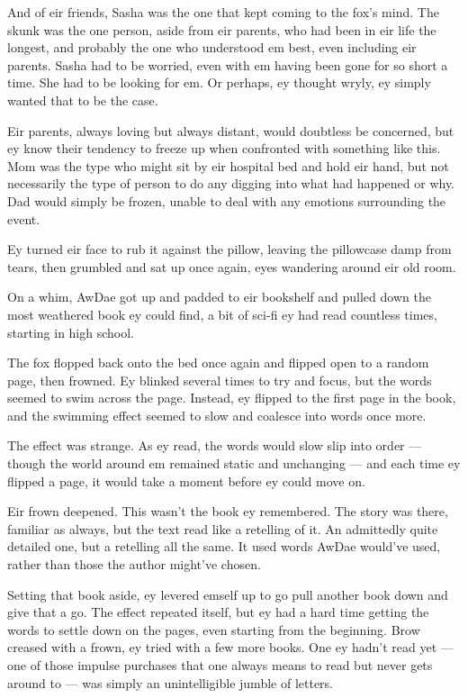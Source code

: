 And of eir friends, Sasha was the one that kept coming to the fox's mind. The skunk was the one person, aside from eir parents, who had been in eir life the longest, and probably the one who understood em best, even including eir parents. Sasha had to be worried, even with em having been gone for so short a time. She had to be looking for em. Or perhaps, ey thought wryly, ey simply wanted that to be the case.

Eir parents, always loving but always distant, would doubtless be concerned, but ey know their tendency to freeze up when confronted with something like this. Mom was the type who might sit by eir hospital bed and hold eir hand, but not necessarily the type of person to do any digging into what had happened or why. Dad would simply be frozen, unable to deal with any emotions surrounding the event.

Ey turned eir face to rub it against the pillow, leaving the pillowcase damp from tears, then grumbled and sat up once again, eyes wandering around eir old room.

On a whim, AwDae got up and padded to eir bookshelf and pulled down the most weathered book ey could find, a bit of sci-fi ey had read countless times, starting in high school.

The fox flopped back onto the bed once again and flipped open to a random page, then frowned. Ey blinked several times to try and focus, but the words seemed to swim across the page. Instead, ey flipped to the first page in the book, and the swimming effect seemed to slow and coalesce into words once more.

The effect was strange. As ey read, the words would slow slip into order --- though the world around em remained static and unchanging --- and each time ey flipped a page, it would take a moment before ey could move on.

Eir frown deepened. This wasn't the book ey remembered. The story was there, familiar as always, but the text read like a retelling of it. An admittedly quite detailed one, but a retelling all the same. It used words AwDae would've used, rather than those the author might've chosen.

Setting that book aside, ey levered emself up to go pull another book down and give that a go. The effect repeated itself, but ey had a hard time getting the words to settle down on the pages, even starting from the beginning. Brow creased with a frown, ey tried with a few more books. One ey hadn't read yet --- one of those impulse purchases that one always means to read but never gets around to --- was simply an unintelligible jumble of letters.

